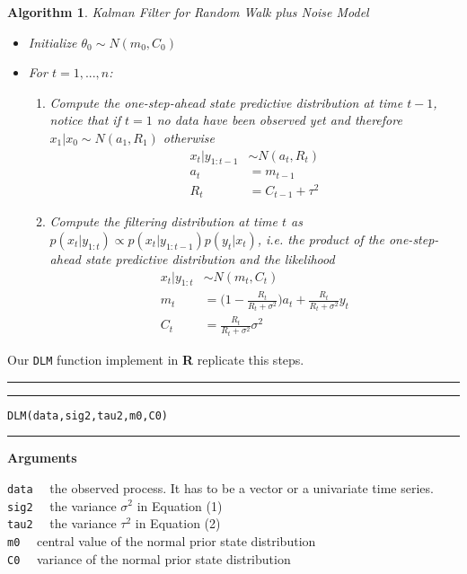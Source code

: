 \documentclass[
]{article}
\newtheorem{algorithm}{Algorithm}[section]
\begin{document}
\begin{algorithm} Kalman Filter for Random Walk plus Noise Model
\begin{itemize}
\item Initialize $\theta_{0} \sim N(m_{0},C_{0})$
\item For $t=1,...,n$:
\begin{enumerate}
\item Compute the one-step-ahead state predictive distribution at time $t-1$, notice that if $t=1$ no data have been observed yet and therefore $x_{1}|x_{0}\sim N(a_{1},R_{1})$ otherwise
\begin{align*}
x_{t}|y_{1:t-1} & \sim N(a_{t},R_{t})\\
a_{t} & = m_{t-1}\\
R_{t} & = C_{t-1}+\tau^2
\end{align*}
\item Compute the filtering distribution at time $t$ as $p(x_{t}|y_{1:t}) \propto p(x_{t}|y_{1:t-1})p(y_{t}|x_{t})$, i.e. the product of the one-step-ahead state predictive distribution and the likelihood
\begin{align*}
x_{t}|y_{1:t} & \sim N(m_{t},C_{t}) \\
m_{t} & = \big(1-\frac{R_{t}}{R_{t}+\sigma^2}\big)a_{t}+\frac{R_{t}}{R_{t}+\sigma^2}y_{t} \\
C_{t} & = \frac{R_{t}}{R_{t}+\sigma^2}\sigma^2
\end{align*}
\end{enumerate}
\end{itemize}
\end{algorithm}

Our \texttt{DLM} function implement in
\textnormal{\sffamily\bfseries R} replicate this steps.\\

\hrule
\hrule

\hfill\break
\texttt{DLM(data,sig2,tau2,m0,C0)}\\

\hrule

\textbf{Arguments}

\texttt{data} ~~the observed process. It has to be a vector or a
univariate time series.\\
\texttt{sig2} ~~the variance \(\sigma^{2}\) in Equation (1)\\
\texttt{tau2} ~~the variance \(\tau^{2}\) in Equation (2)\\
\texttt{m0} ~~central value of the normal prior state distribution\\
\texttt{C0} ~~variance of the normal prior state distribution
\end{document}
